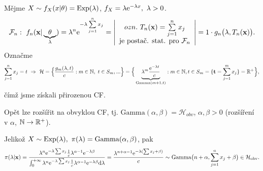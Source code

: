 \begin{example}
	Mějme $X\sim f_X(x|\theta)=\mathrm{Exp}(\lambda)$, $f_X=\lambda\mathrm{e}^{-\lambda x},~\lambda>0$. $$\mathcal{F}_n: ~f_n(\textbf{x}|\underbrace{\theta}_{\lambda})=\lambda^n\mathrm{e}^{-\lambda\sum\limits_{j=1}^{n} x_j}=\left|\begin{array}{c}
	ozn.~T_n(\textbf{x})=\sum\limits_{j=1}^{n} x_j\\\text{je postač. stat. pro }\mathcal{F}_n
\end{array}
\right|=1\cdot g_n\big(\lambda,T_n(\textbf{x})\big).$$
Označme $$\sum\limits_{j=1}^{n} x_j=t~\Rightarrow~\mathcal{H}=\Big\{ \frac{g_m(\lambda,t)}{c}:m\in\mathbb{N},~t\in S_m,... \Big\}=\Big\{\underbrace{\lambda^m\frac{\mathrm{e}^{-\lambda t}}{c}}_{\mathrm{Gamma}(m+1,t)}:m\in\mathbb{N},t\in S_m=\{\textbf{t}=\sum_{j=1}^m x_j \}=\mathbb{R}^+\Big\},$$
čímž jsme získali přirozenou CF.

Opět lze rozšířit na obvyklou CF, tj. $\mathrm{Gamma} (\alpha,\beta)=\mathcal{H}_{obv}$, $\alpha,\beta >0$ (rozšíření v $\alpha$, $\mathbb{N}\rightarrow \mathbb{R}^{+}$).

Jelikož $X\sim\mathrm{Exp}(\lambda),~\pi(\lambda)=\mathrm{Gamma}(\alpha,\beta)$, pak 
$$ \pi(\lambda|\textbf{x})=\frac{\lambda^n\mathrm{e}^{-\lambda\sum x_j}\frac{1}{c}\lambda^{\alpha-1}\mathrm{e}^{-\lambda\beta}}{\int_{0}^{+\infty}\lambda^n\mathrm{e}^{-\lambda\sum x_j}\frac{1}{c}\lambda^{\alpha-1}\mathrm{e}^{-\lambda\beta}\mathrm{d}\lambda}=\frac{\lambda^{n+\alpha-1}\mathrm{e}^{-\lambda(\sum x_j+\beta)}}{c}\sim\mathrm{Gamma}\big(n+\alpha,\sum\limits_{j=1}^{n} x_j+\beta\big)\in\mathcal{H}_\text{obv} .$$


\end{example}
